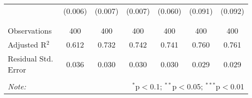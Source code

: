 \begin{table}[!htbp]
\begin{tabular}{@{\extracolsep{5pt}}lcccccc}
  & (0.006) & (0.007) & (0.007) & (0.060) & (0.091) & (0.092) \\ 
  & & & & & & \\ 
\hline \\[-1.8ex] 
Observations & 400 & 400 & 400 & 400 & 400 & 400 \\ 
Adjusted R$^{2}$ & 0.612 & 0.732 & 0.742 & 0.741 & 0.760 & 0.761 \\ 
Residual Std. Error & 0.036 & 0.030 & 0.030 & 0.030 & 0.029 & 0.029 \\ 
\hline 
\hline \\[-1.8ex] 
\textit{Note:}  & \multicolumn{6}{r}{$^{*}$p$<$0.1; $^{**}$p$<$0.05; $^{***}$p$<$0.01} \\ 
\end{tabular} 
\end{table} 
